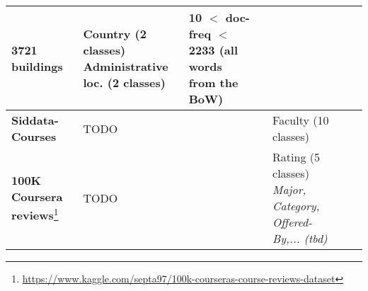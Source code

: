 \begin{landscape}
\begin{table}[]
{\begin{tabular}{@{}lllllll@{}}
					3721 buildings &
					\specialcell[l]{ \tabitem Country (2 classes)\\ \tabitem Administrative loc. (2 classes)} &
					\specialcell[l]{10 $<$ doc-freq $<$ 2233 \\ (all words from the BoW) }\\ \midrule \midrule
				\textbf{Siddata-Courses} &
					TODO &
					&
					&
					\tabitem Faculty (10 classes) 
					\\ \midrule 
				\textbf{100K Coursera reviews}\footnote{\url{https://www.kaggle.com/septa97/100k-courseras-course-reviews-dataset}} &
					TODO &
					&
					&
					\specialcell[l]{ \tabitem Rating (5 classes) \\ \textit{\tabitem Major, Category, Offered-By,... (tbd)} }
					\\ 
			\end{tabular}
			\label{tab:all_datasets}
		}
	\end{table}
\end{landscape}	